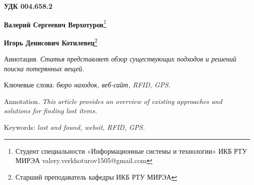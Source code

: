\documentclass{mirea-article}
\begin{document}
	
	\textbf{УДК 004.658.2}
	
	\begin{FlushRight}
		\textbf{Валерий Сергеевич Верхотуров}\footnote{Студент специальности «Информационные системы и технологии» ИКБ РТУ МИРЭА valery.verkhoturov1505@gmail.com} 

		\textbf{Игорь Денисович Котилевец}\footnote{Старший преподаватель кафедры ИКБ РТУ МИРЭА}
	\end{FlushRight}
	
	
	Аннотация. \textit{Статья представляет обзор существующих подходов и решений поиска потерянных вещей.}
	
	Ключевые слова: \textit{бюро находок, веб-сайт, RFID, GPS.}
	
	
	Annotation. \textit{This article provides an overview of existing approaches and solutions for finding lost items. }
	
	Keywords: \textit{lost and found, websit, RFID, GPS.}
	
\end{document}
